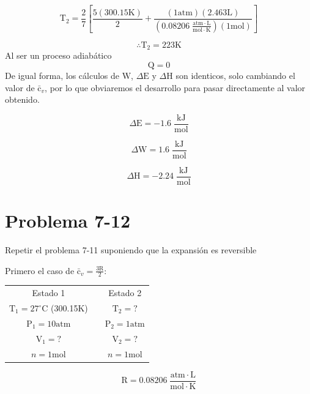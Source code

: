 \documentclass[12pt]{article}
\begin{document}
\begin{displaymath}
	\mathrm{T}_2=\frac{2}{7}\left[ \frac{5(300.15\mathrm{K})}{2} +\frac{(1\mathrm{atm})(2.463\mathrm{L})}{(0.08206\; \frac{\mathrm{atm}\cdot\mathrm{L}}{\mathrm{mol}\cdot\mathrm{K}})(1\mathrm{mol})} \right]
\end{displaymath}

\begin{displaymath}
	\therefore \mathrm{T}_2=223\mathrm{K}
\end{displaymath}
Al ser un proceso adiabático 
\begin{displaymath}
	\mathrm{Q}=0
\end{displaymath}
De igual forma, los cálculos de $\mathrm{W}$, $\Delta\mathrm{E}$ y $\Delta\mathrm{H}$ son identicos, solo cambiando el valor de $\mathrm{\bar{c}}_v$, por lo que obviaremos el desarrollo para pasar directamente al valor obtenido.

\begin{displaymath}
	\Delta\mathrm{E}=-1.6\; \frac{\mathrm{kJ}}{\mathrm{mol}}
\end{displaymath}

\begin{displaymath}
	\Delta\mathrm{W}=1.6\; \frac{\mathrm{kJ}}{\mathrm{mol}}
\end{displaymath}

\begin{displaymath}
	\Delta\mathrm{H}=-2.24\; \frac{\mathrm{kJ}}{\mathrm{mol}}
\end{displaymath}
\newpage
\section*{Problema 7-12}
Repetir el problema 7-11 suponiendo que la expansión es reversible

Primero el caso de $\mathrm{\bar{c}}_v=\frac{3\mathrm{R}}{2}$:
\begin{center}
	\begin{tabular}{c c c}
		Estado 1 &   &  Estado 2 \\
		$\mathrm{T}_1=27^{\circ}\mathrm{C}$\; (300.15$\mathrm{K}$) &   & $\mathrm{T}_2=?$ \\
		$\mathrm{P}_1=10\mathrm{atm}$ &   & $\mathrm{P}_2=1\mathrm{atm}$ \\
		$\mathrm{V}_1=?$ &   & $\mathrm{V}_2=?$\\
		$n=1\mathrm{mol}$&   & $n=1\mathrm{mol}$
	\end{tabular}
	\begin{displaymath}
		\mathrm{R}=0.08206\; \frac{\mathrm{atm}\cdot\mathrm{L}}{\mathrm{mol}\cdot\mathrm{K}}
	\end{displaymath}
\end{center}
\end{document}
